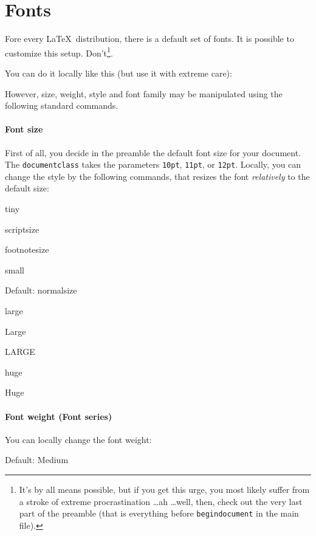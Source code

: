 \section{Fonts}

Fore every   \LaTeX\ distribution, there is a default set of fonts.
It is possible to customize this  setup.
Don't\footnote{It's by all means possible, but if you get this urge, you most likely suffer from a stroke of extreme procrastination \dots ah \dots well, then, check out the very last part of the preamble (that is everything before {\tt begin{document}} in the main file).}.

You can do it locally like this (but use it with extreme care):


{\selectfont \lipsum[21]}

However, size, weight, style and font family may be manipulated using the following standard commands.



\paragraph{Font size}

First of all, you decide in the preamble the default font size for your document. The {\tt documentclass} takes the parameters {\tt 10pt},  {\tt 11pt},  or {\tt 12pt}. Locally, you can change the style by the following commands, that resizes the font {\em relatively} to the default size:


    \tiny tiny
    
    \scriptsize scriptsize
    
    \footnotesize footnotesize
    
    \small small
    
    \normalsize Default: normalsize
    
    \large  large
    
    \Large Large
    
    \LARGE LARGE
    
    \huge huge
    
    \Huge  Huge
    
    \normalsize 
    
\paragraph{Font weight (Font series)}
You can locally change the font weight:
    
    \textmd{Default: Medium}
    
